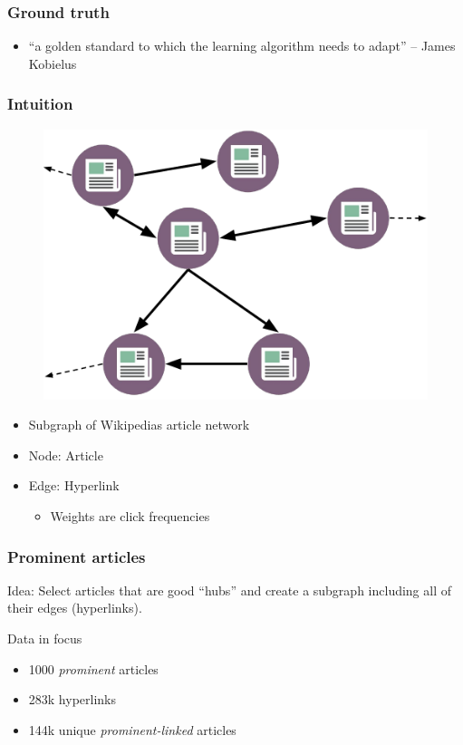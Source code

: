
\begin{frame}
  \frametitle{Ground truth}
  
  \begin{itemize}
\item ``a golden standard to which the learning algorithm needs to adapt'' -- James Kobielus
\end{itemize}
  
  
\end{frame}


\begin{frame}
  \frametitle{Intuition}  

  \begin{figure}[tbph]
    \centering
    \includegraphics[width=0.5\linewidth]{images/wiki_gt_graph}
  \end{figure}
  
    \begin{itemize}
   \item Subgraph of Wikipedias article network
   \item Node: Article
   \item Edge: Hyperlink
   \begin{itemize}
  \item Weights are click frequencies
\end{itemize}
 
\end{itemize}
  
\end{frame}


\begin{frame}
  \frametitle{Prominent articles}
  
  Idea: Select articles that are good ``hubs'' and create a subgraph including all of their edges (hyperlinks).
  
    \begin{block}{Data in focus}
      \begin{itemize}
      \item 1000 \textit{prominent} articles
      \item 283k hyperlinks
      \item 144k unique \textit{prominent-linked} articles
	\end{itemize}
  \end{block}
  
\end{frame}


